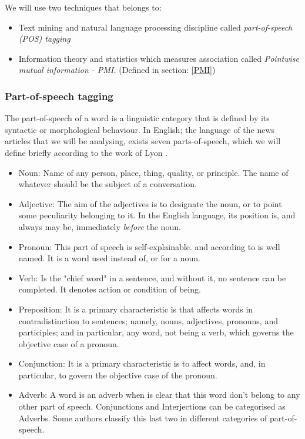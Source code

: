 We will use two techniques that belongs to:
	\begin{itemize}
		\item Text mining and natural language processing discipline called \emph{part-of-speech (POS) tagging}
		\item Information theory and statistics which measures association called \emph{Pointwise mutual information - PMI.} (Defined in section: \ref{PMI})
	\end{itemize}

\subsubsection{Part-of-speech tagging}\label{partOfSpeech}

The part-of-speech of a word is a linguistic category that is defined by its syntactic or morphological behaviour. In English; the language of the news articles that we will be analysing, exists seven parts-of-speech, which we will define briefly according to the work of Lyon \cite{L1832}.

	\begin{itemize}
		\item Noun: Name of any person, place, thing, quality, or principle. The name of whatever should be the subject of a conversation.
		\item Adjective: The aim of the adjectives is to designate the noun, or to point some peculiarity belonging to it. In the English language, its position is, and always may be, immediately \emph{before} the noun.
		\item Pronoun: This part of speech is self-explainable. and according to \cite%
		{L1832}  is well named. It is a word used instead of, or for a noun.
		\item Verb: Is the "chief word" in a sentence, and without it, no sentence can be completed. It denotes action or condition of being.
		\item Preposition: It is a primary characteristic is that affects words in contradistinction to sentences; namely, nouns, adjectives, pronouns, and participles; and in particular, any word, not being a verb, which governs the objective case of a pronoun.
		\item Conjunction: It is a primary characteristic is to affect words, and, in particular, to govern the objective case of the pronoun.
		\item Adverb: A word is an adverb when is clear that this word don't belong to any other part of speech. Conjunctions and Interjections can be categorised as Adverbs. Some authors classify this last two in different categories of part-of-speech.
	\end{itemize}
	
